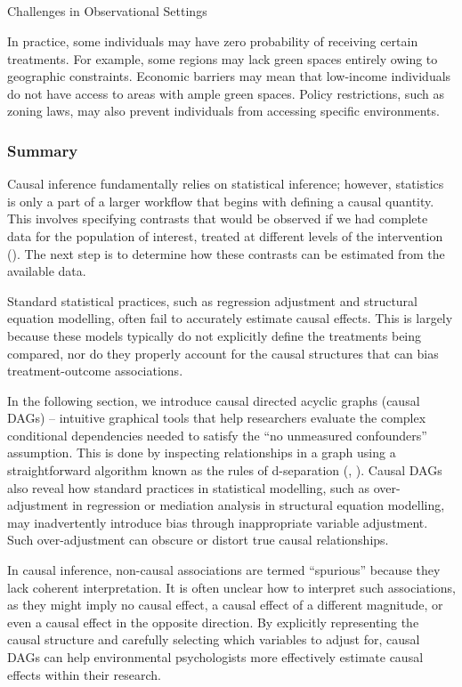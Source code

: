 \documentclass[
  singlecolumn]{article}
\makeatletter
\let\oldsubparagraph\subparagraph
\renewcommand{\subparagraph}{
    \@ifstar
      \xxxSubParagraphStar
      \xxxSubParagraphNoStar
  }
\newcommand{\xxxSubParagraphStar}[1]{\oldsubparagraph*{#1}\mbox{}}
\newcommand{\xxxSubParagraphNoStar}[1]{\oldsubparagraph{#1}\mbox{}}
\makeatother
\begin{document}
\subparagraph{Challenges in Observational
Settings}\label{challenges-in-observational-settings-2}

In practice, some individuals may have zero probability of receiving
certain treatments. For example, some regions may lack green spaces
entirely owing to geographic constraints. Economic barriers may mean
that low-income individuals do not have access to areas with ample green
spaces. Policy restrictions, such as zoning laws, may also prevent
individuals from accessing specific environments.

\subsubsection{Summary}\label{summary}

Causal inference fundamentally relies on statistical inference; however,
statistics is only a part of a larger workflow that begins with defining
a causal quantity. This involves specifying contrasts that would be
observed if we had complete data for the population of interest, treated
at different levels of the intervention
(). The next step is
to determine how these contrasts can be estimated from the available
data.

Standard statistical practices, such as regression adjustment and
structural equation modelling, often fail to accurately estimate causal
effects. This is largely because these models typically do not
explicitly define the treatments being compared, nor do they properly
account for the causal structures that can bias treatment-outcome
associations.

In the following section, we introduce causal directed acyclic graphs
(causal DAGs) -- intuitive graphical tools that help researchers
evaluate the complex conditional dependencies needed to satisfy the ``no
unmeasured confounders'' assumption. This is done by inspecting
relationships in a graph using a straightforward algorithm known as the
rules of d-separation (,
). Causal DAGs also reveal how standard
practices in statistical modelling, such as over-adjustment in
regression or mediation analysis in structural equation modelling, may
inadvertently introduce bias through inappropriate variable adjustment.
Such over-adjustment can obscure or distort true causal relationships.

In causal inference, non-causal associations are termed ``spurious''
because they lack coherent interpretation. It is often unclear how to
interpret such associations, as they might imply no causal effect, a
causal effect of a different magnitude, or even a causal effect in the
opposite direction. By explicitly representing the causal structure and
carefully selecting which variables to adjust for, causal DAGs can help
environmental psychologists more effectively estimate causal effects
within their research.
\end{document}
